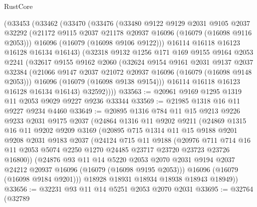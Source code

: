 \begin{lexlean}{RustCore}
\begin{coremodule}
    (@33453
      (@33462
        (@33470
          (@33476
            (@33480
              @9122
              @9129
              @2031
              @9105
              @2037
              @32292
              (@21172 @9115 @2037 @21178 @20937 @16096 (@16079 (@16098 @9116 @2053)))
              @16096
              (@16079 (@16098 @9106 @9122)))
            @16114
            @16118
            @16123
            @16128
            @16134
            @16143)
          (@32318
            @9132
            @1256
            @171
            @169
            @9155
            @9164
            @2053
            @2241
            (@32617
              @9155
              @9162
              @2060
              (@32624
                @9154
                @9161
                @2031
                @9137
                @2037
                @32384
                (@21066 @9147 @2037 @21072 @20937 @16096 (@16079 (@16098 @9148 @2053)))
                @16096
                (@16079 (@16098 @9138 @9154)))
              @16114
              @16118
              @16123
              @16128
              @16134
              @16143)
            @32592))))
@33563 := @20961 @9169 @1295 @1319 @11 @2053 @9029 @9227 @9236 @33344
@33569 := @21985 @1318 @16 @11 @9227 @9234 @4460
@33649 := @20895
    @1316
    @784
    @11
    @15
    @9213
    @9226
    @9233
    @2031
    @9175
    @2037
    (@24864
      @1316
      @11
      @9202
      @9211
      (@24869
        @1315
        @16
        @11
        @9202
        @9209
        @3169
        (@20895
          @715
          @1314
          @11
          @15
          @9188
          @9201
          @9208
          @2031
          @9183
          @2037
          (@24124
            @715
            @11
            @9188
            (@20976
              @711
              @714
              @16
              @11
              @2053
              @5074
              @2250
              @1270
              @24485
              @23717
              @23720
              @23723
              @23726
              @16800))
          (@24876
            @93
            @11
            @14
            @5220
            @2053
            @2070
            @2031
            @9194
            @2037
            @24212
            @20937
            @16096
            (@16079 (@16098 @9195 @2053)))
          @16096
          (@16079 (@16098 @9184 @9201)))
        @18928
        @18931
        @18934
        @18938
        @18943
        @18949))
@33656 := @32231 @93 @11 @14 @5251 @2053 @2070 @2031
@33695 := @32764
    (@32789

\end{coremodule}
\end{lexlean}
